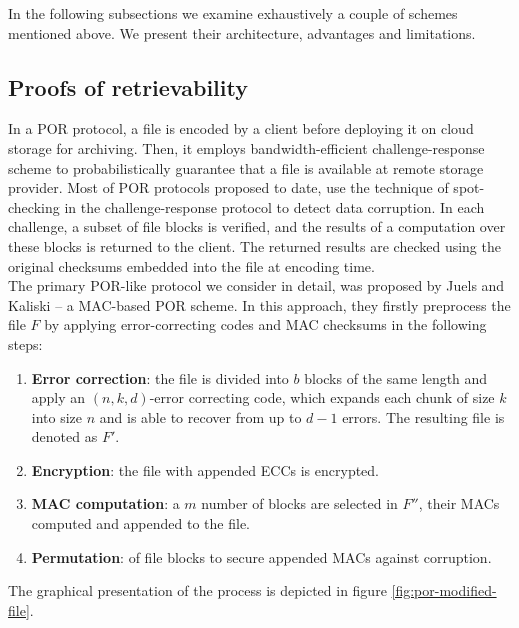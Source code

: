 In the following subsections we examine exhaustively a couple of schemes
mentioned above. We present their architecture, advantages and limitations.

		\subsection{Proofs of retrievability}
In a POR \cite{por, por2} protocol, a file is encoded by a client before
deploying it on cloud storage for archiving. Then, it employs
bandwidth-efficient challenge-response scheme to probabilistically guarantee
that a file is available at remote storage provider. Most of POR protocols 
proposed to date, use the technique of spot-checking in the challenge-response
protocol to detect data corruption. In each challenge, a subset of file blocks
is verified, and the results of a computation over these blocks is returned to
the client. The returned results are checked using the original checksums
embedded into the file at encoding time.\\

The primary POR-like protocol we consider in detail, was proposed by Juels and
Kaliski \cite{por} -- a MAC-based POR scheme. In this approach, they firstly
preprocess the file $F$ by applying error-correcting codes and MAC checksums
in the following steps:

\begin{enumerate}
	\item \textbf{Error correction}: the file is divided into $b$ blocks of the
	same length and apply an $(n,k,d)$-error correcting code,
	which expands each chunk of size $k$ into size $n$ and is able to recover
	from up to $d-1$ errors. The resulting file is denoted as $F'$.
	\item \textbf{Encryption}: the file with appended ECCs is encrypted.
	\item \textbf{MAC computation}: a $m$ number of blocks are selected in
	$F''$, their MACs computed and appended to the file.
	\item \textbf{Permutation}: of file blocks to secure appended MACs against
	corruption.
\end{enumerate}

The graphical presentation of the process is depicted in figure \ref{fig:por-modified-file}.\\

